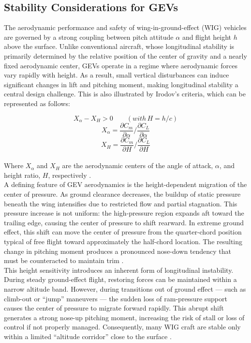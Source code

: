 \subsection{Stability Considerations for GEVs}

The aerodynamic performance and safety of wing-in-ground-effect (WIG) vehicles are governed by a strong coupling between pitch attitude $ \alpha $ and flight height $ h $ above the surface. Unlike conventional aircraft, whose longitudinal stability is primarily determined by the relative position of the center of gravity and a nearly fixed aerodynamic center, GEVs operate in a regime where aerodynamic forces vary rapidly with height. As a result, small vertical disturbances can induce significant changes in lift and pitching moment, making longitudinal stability a central design challenge. This is also illustrated by Irodov's criteria, which can be represented as follows:

\[X_{\alpha} - X_{H} > 0 \qquad(with\,H = h/c)\]
\[X_{\alpha} = \frac{\partial C_m}{\partial \alpha}\Big/ \frac{\partial C_L}{\partial \alpha}\]
\[X_{H} = \frac{\partial C_m}{\partial H}\Big/ \frac{\partial C_L}{\partial H}\]\\

\noindent Where $X_{\alpha}$ and $X_{H}$ are the aerodynamic centers of the angle of attack, $\alpha$, and height ratio, $H$, respectively \cite{Longitudinal_stability_study}.\\

\noindent A defining feature of GEV aerodynamics is the height-dependent migration of the center of pressure. As ground clearance decreases, the buildup of static pressure beneath the wing intensifies due to restricted flow and partial stagnation. This pressure increase is not uniform: the high-pressure region expands aft toward the trailing edge, causing the center of pressure to shift rearward. In extreme ground effect, this shift can move the center of pressure from the quarter-chord position typical of free flight toward approximately the half-chord location. The resulting change in pitching moment produces a pronounced nose-down tendency that must be counteracted to maintain trim \cite{ISU_thesis}.\\

\noindent This height sensitivity introduces an inherent form of longitudinal instability. During steady ground-effect flight, restoring forces can be maintained within a narrow altitude band. However, during transitions out of ground effect — such as climb-out or “jump” maneuvers — the sudden loss of ram-pressure support causes the center of pressure to migrate forward rapidly. This abrupt shift generates a strong nose-up pitching moment, increasing the risk of stall or loss of control if not properly managed. Consequently, many WIG craft are stable only within a limited “altitude corridor” close to the surface \cite{IFAC_new-gen_control_systems}.\\

